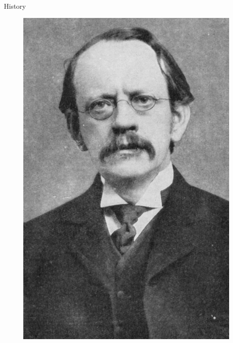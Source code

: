 \documentclass[10pt]{beamer}
\begin{document}
{\begin{frame}{History}
\begin{figure}
        \includegraphics[height=0.25\textheight]{figures/Thomson.jpg}

\end{figure}
\end{frame}}
\end{document}
